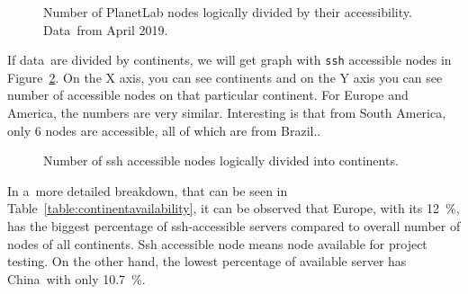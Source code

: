 {{{{{{{\begin{figure}[H]
	\centering
	\caption{Number of PlanetLab nodes logically divided by their accessibility. Data~from April 2019.}
	\label{fig:nodestats}
\end{figure}

If data~are divided by continents, we will get graph with \texttt{ssh} accessible nodes in Figure~\ref{fig:sshcountriesgraph}. On the X axis, you can see continents and on the Y axis you can see number of accessible nodes on that particular continent. For Europe and America, the numbers are very similar. Interesting is that from South America, only 6 nodes are accessible, all of which are from Brazil..

\begin{figure}[H]
	\centering
	\caption{Number of ssh accessible nodes logically divided into continents.}
	\label{fig:sshcountriesgraph}
\end{figure}

In a~more detailed breakdown, that can be seen in  Table~\ref{table:continentavailability}, it can be observed that Europe, with its \SI{12}{\percent}, has the biggest percentage of ssh-accessible servers compared to overall number of nodes of all continents. Ssh accessible node means node available for project testing. On the other hand, the lowest percentage of available server has China~with only \SI{10.7}{\percent}.

}}}}}}}
